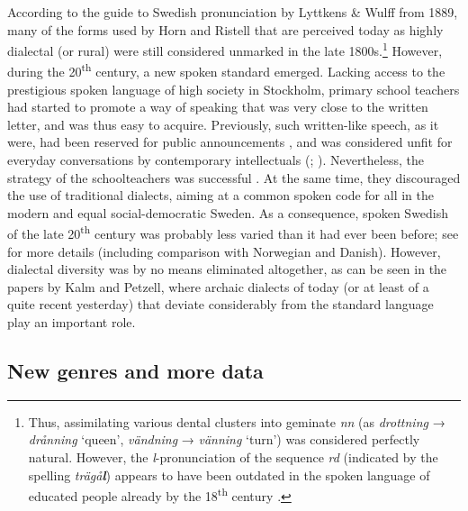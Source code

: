 \documentclass[output=paper]{langscibook}
\begin{document}
According to the guide to Swedish pronunciation by Lyttkens \& Wulff from 1889, many of the forms used by Horn and Ristell that are perceived today as highly dialectal (or rural) were still considered unmarked in the late 1800s.\footnote{Thus, assimilating various dental clusters into geminate \textit{nn} (as \textit{drottning} → \textit{drånning} ‘queen’, \textit{vändning} → \textit{vänning} ‘turn’) was considered perfectly natural. However, the \textit{l}{}-pronunciation of the sequence \textit{rd} (indicated by the spelling \textit{trägå}\textbf{\textit{l}}) appears to have been outdated in the spoken language of educated people already by the 18\textsuperscript{th} century \citep{Hof1753}.} However, during the 20\textsuperscript{th} century, a new spoken standard emerged. Lacking access to the prestigious spoken language of high society in Stockholm, primary school teachers had started to promote a way of speaking that was very close to the written letter, and was thus easy to acquire. Previously, such written-like speech, as it were, had been reserved for public announcements \citep{Widmark1970}, and was considered unfit for everyday conversations by contemporary intellectuals (\citealt{Cederschiold1897}; \citealt{Noreen1903}). Nevertheless, the strategy of the schoolteachers was successful \citep{Widmark2000}. At the same time, they discouraged the use of traditional dialects, aiming at a common spoken code for all in the modern and equal social-democratic Sweden. As a consequence, spoken Swedish of the late 20\textsuperscript{th} century was probably less varied than it had ever been before; see \citet{NilssonPetzell2015} for more details (including comparison with Norwegian and Danish). However, dialectal diversity was by no means eliminated altogether, as can be seen in the papers by Kalm and Petzell, where archaic dialects of today (or at least of a quite recent yesterday) that deviate considerably from the standard language play an important role.


\subsection{New genres and more data}\label{sec:intro:2.3}
\end{document}
